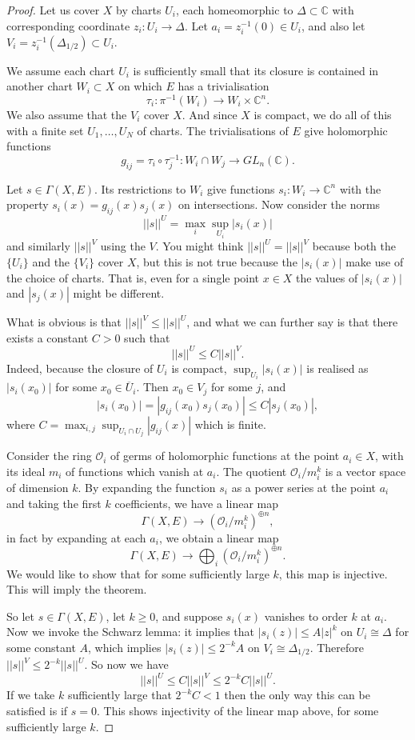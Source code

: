 \documentclass[12pt]{article}
\theoremstyle{plain}
\theoremstyle{definition}
\numberwithin{equation}{section}
\newcommand{\ov}[1]{\overline#1}
\newcommand{\D}{\Delta}
\newcommand{\C}{\mathbb{C}}
\newcommand{\OO}{\mathcal{O}}
\begin{document}
\begin{proof}
Let us cover $X$ by charts $U_i$, each homeomorphic to $\D \subset \C$ with corresponding coordinate $z_i : U_i \rightarrow \D$. Let $a_i = z_i^{-1}(0) \in U_i$, and also let $V_i = z_i^{-1}(\D_{1/2}) \subset U_i$.

We assume each chart $U_i$ is sufficiently small that its closure is contained in another chart $W_i \subset X$ on which $E$ has a trivialisation
\[
\tau_i : \pi^{-1}(W_i) \rightarrow W_i \times \C^n.
\]
We also assume that the $V_i$ cover $X$. And since $X$ is compact, we do all of this with a finite set $U_1, \ldots, U_N$ of charts. The trivialisations of $E$ give holomorphic functions
\[
g_{ij} = \tau_i \circ \tau_j^{-1} : W_i \cap W_j \rightarrow GL_n(\C).
\]

Let $s \in \Gamma(X, E)$. Its restrictions to $W_i$ give functions $s_i : W_i \rightarrow \C^n$ with the property $s_i(x) = g_{ij}(x) s_j(x)$ on intersections. Now consider the norms
\[
||s||^U = \max_i \sup_{U_i} |s_i(x)|
\]
and similarly $||s||^V$ using the $V$. You might think $||s||^U = ||s||^V$ because both the $\{U_i\}$ and the $\{V_i\}$ cover $X$, but this is not true because the $|s_i(x)|$ make use of the choice of charts. That is, even for a single point $x \in X$ the values of $|s_i(x)|$ and $|s_j(x)|$ might be different.

What is obvious is that $||s||^V \leq ||s||^U$, and what we can further say is that there exists a constant $C > 0$ such that
\[
||s||^U \leq C ||s||^V.
\]
Indeed, because the closure of $U_i$ is compact, $\sup_{U_i} |s_i(x)|$ is realised as $|s_i(x_0)|$ for some $x_0 \in \ov{U}_i$. Then $x_0 \in V_j$ for some $j$, and
\[
|s_i(x_0)| = |g_{ij}(x_0) s_j(x_0)| \leq C |s_j(x_0)|,
\]
where $C = \max_{i, j} \sup_{U_i \cap U_j} |g_{ij}(x)|$ which is finite.

Consider the ring $\OO_i$ of germs of holomorphic functions at the point $a_i \in X$, with its ideal $m_i$ of functions which vanish at $a_i$. The quotient $\OO_i / m_i^k$ is a vector space of dimension $k$. By expanding the function $s_i$ as a power series at the point $a_i$ and taking the first $k$ coefficients, we have a linear map
\[
\Gamma(X, E) \rightarrow (\OO_i / m_i^k)^{\oplus n},
\]
in fact by expanding at each $a_i$, we obtain a linear map
\[
\Gamma(X, E) \rightarrow \bigoplus_i (\OO_i / m_i^k)^{\oplus n}.
\]
We would like to show that for some sufficiently large $k$, this map is injective. This will imply the theorem.

So let $s \in \Gamma(X, E)$, let $k \geq 0$, and suppose $s_i(x)$ vanishes to order $k$ at $a_i$. Now we invoke the Schwarz lemma: it implies that $|s_i(z)| \leq A |z|^k$ on $U_i \cong \D$ for some constant $A$, which implies $|s_i(z)| \leq 2^{-k} A$ on $V_i \cong \D_{1/2}$. Therefore $||s||^V \leq 2^{-k} ||s||^U$. So now we have
\[
||s||^U \leq C ||s||^V \leq 2^{-k} C ||s||^U.
\]
If we take $k$ sufficiently large that $2^{-k} C < 1$ then the only way this can be satisfied is if $s = 0$. This shows injectivity of the linear map above, for some sufficiently large $k$.
\end{proof}
\end{document}
